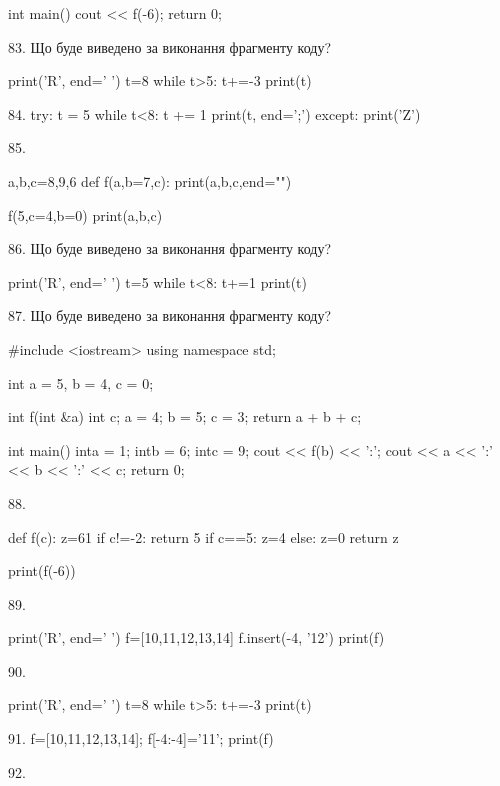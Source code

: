 \documentclass[11pt]{article}
\begin{document}
int main(){
    cout << f(-6);
    return 0;
}



83. Що буде виведено за виконання фрагменту коду?

print('R', end=' ')
t=8
while t>5:
    t+=-3
print(t)



84. 
try:
    t = 5
    while t<8:
        t += 1
    print(t, end=';')
except:
    print('Z')


85. 

a,b,c=8,9,6
def f(a,b=7,c):
    print(a,b,c,end="")

f(5,c=4,b=0)
print(a,b,c)



86. Що буде виведено за виконання фрагменту коду?

print('R', end=' ')
t=5
while t<8:
    t+=1
print(t)



87. Що буде виведено за виконання фрагменту коду?

#include <iostream>
using namespace std;

int a = 5, b = 4, c = 0;

int f(int &a){
int c;    a = 4;
    b = 5;
    c = 3;
    return a + b + c;
}

int main(){
    inta = 1;
    intb = 6;
    intc = 9;
    cout << f(b) << ':';
    cout << a << ':' << b << ':' << c;
    return 0; 
}


88. 

def f(c):
    z=61
    if c!=-2: 
        return 5
    if c==5:
         z=4
    else:
         z=0
    return z

print(f(-6))


89. 

print('R', end=' ')
f=[10,11,12,13,14]
f.insert(-4, '12')
print(f)



90. 

print('R', end=' ')
t=8
while t>5:
    t+=-3
print(t)



91. 
f=[10,11,12,13,14]; f[-4:-4]='11'; print(f)

92. 
\end{document}

